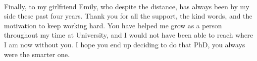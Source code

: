 \paragraph{}Finally, to my girlfriend Emily, who despite the distance, has always been by my side these past four years. Thank you for all the support, the kind words, and the motivation to keep working hard. You have helped me grow as a person throughout my time at University, and I would not have been able to reach where I am now without you. I hope you end up deciding to do that PhD, you always were the smarter one.

